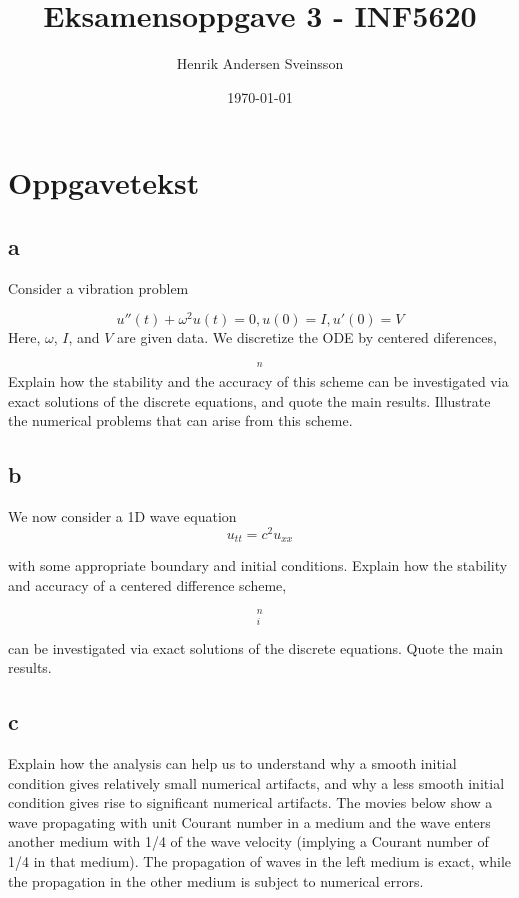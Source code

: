 \documentclass[a4paper, 10pt]{article}
\author{Henrik Andersen Sveinsson}
\title{Eksamensoppgave 3 - INF5620}
\date{\today}
\begin{document}
\maketitle

\section{Oppgavetekst}
\subsection{a} 
Consider a vibration problem

\begin{equation}
	u''(t)+\omega^2 u(t)=0,u(0)=I, u'(0)=V
\end{equation}
Here, $\omega$, $I$, and $V$ are given data. We discretize the ODE by centered diferences,

\begin{equation}
	[D_tD_tu+\omega^2u=0]^n
\end{equation}
Explain how the stability and the accuracy of this scheme can be investigated via exact solutions of the discrete equations, and quote the main results. Illustrate the numerical problems that can arise from this scheme.

\subsection{b} 
We now consider a 1D wave equation
\begin{equation}
u_{tt}=c^2u_{xx}	
\end{equation}

with some appropriate boundary and initial conditions. Explain how the stability and accuracy of a centered difference scheme,

\begin{equation}
	[D_tD_tu=c^2D_xD_x u]^n_i
\end{equation}

can be investigated via exact solutions of the discrete equations. Quote the main results.

\subsection{c}
 Explain how the analysis can help us to understand why a smooth initial condition gives relatively small numerical artifacts, and why a less smooth initial condition gives rise to significant numerical artifacts. The movies below show a wave propagating with unit Courant number in a medium and the wave enters another medium with 1/4 of the wave velocity (implying a Courant number of 1/4 in that medium). The propagation of waves in the left medium is exact, while the propagation in the other medium is subject to numerical errors.
\end{document}
